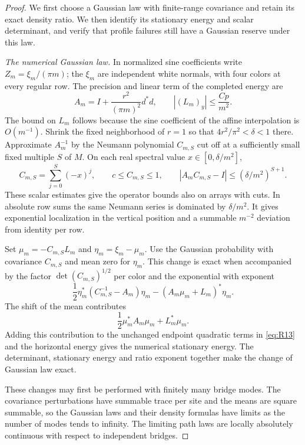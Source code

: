 \begin{proof}
We first choose a Gaussian law with finite-range covariance and retain
its exact density ratio.  We then identify its stationary energy and
scalar determinant, and verify that profile failures still have a
Gaussian reserve under this law.

\emph{The numerical Gaussian law.}
In normalized sine coefficients write $Z_m=\xi_m/(\pi m)$; the
$\xi_m$ are independent white normals, with four colors at every regular
row.  The precision and linear term of the completed energy are
\[
 A_m=I+\frac{r^2}{(\pi m)^2}d^*d,
 \qquad |(L_m)_y|\le \frac{Cp}{m^2}.
\]
The bound on $L_m$ follows because the sine coefficient of the affine
interpolation is $O(m^{-1})$.  Shrink the fixed neighborhood of $r=1$
so that $4r^2/\pi^2<\delta<1$ there.  Approximate $A_m^{-1}$ by the
Neumann polynomial $C_{m,S}$ cut off at a sufficiently small fixed
multiple $S$ of $M$.  On each real spectral value $x\in[0,\delta/m^2]$,
\[
 C_{m,S}=\sum_{j=0}^{S}(-x)^j,
 \qquad c\le C_{m,S}\le1,
 \qquad |A_mC_{m,S}-I|\le (\delta/m^2)^{S+1}.
\]
These scalar estimates give the operator bounds also on arrays with
cuts.  In absolute row sums the same Neumann series is dominated by
$\delta/m^2$.  It gives exponential localization in the vertical
position and a summable $m^{-2}$ deviation from identity per row.

Set $\mu_m=-C_{m,S}L_m$ and $\eta_m=\xi_m-\mu_m$.  Use the Gaussian
probability with covariance $C_{m,S}$ and mean zero for $\eta_m$.
This change is exact when accompanied by the factor
$\det(C_{m,S})^{1/2}$ per color and the exponential with exponent
\[
 \frac12\eta_m^*(C_{m,S}^{-1}-A_m)\eta_m
       -(A_m\mu_m+L_m)^*\eta_m.
\]
The shift of the mean contributes
\[
 \frac12\mu_m^*A_m\mu_m+L_m^*\mu_m.
\]
Adding this contribution to the unchanged endpoint quadratic terms in
\eqref{eq:R13} and the horizontal energy gives the numerical stationary
energy.  The determinant, stationary energy and ratio exponent together
make the change of Gaussian law exact.

These changes may first be performed with finitely many bridge modes.
The covariance perturbations have summable trace per site and the means
are square summable, so the Gaussian laws and their density formulas
have limits as the number of modes tends to infinity.  The limiting
path laws are locally absolutely continuous with respect to independent
bridges.


\end{proof}
